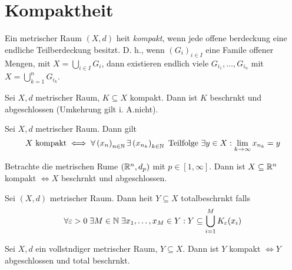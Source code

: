 \section{Kompaktheit}
\begin{definition}
	Ein metrischer Raum \((X, d)\) hei\s t \textit{kompakt}, wenn jede offene \Us berdeckung eine endliche Teil\us berdeckung besitzt. D. h., wenn $(G_i)_{i\in I}$ eine Famile offener Mengen, mit \(X = \bigcup_{i\in I} G_i\), dann existieren endlich viele \(G_{i_1},\ldots, G_{i_n}\) mit \(X = \bigcup_{k=1}^n G_{i_k}\).
\end{definition}
\begin{theorem}
	Sei \(X ,d\) metrischer Raum, \(K\subseteq X\) kompakt. Dann ist $K$ beschr\as nkt und abgeschlossen (Umkehrung gilt i. A.nicht).\label{kompakt_beschr_abg}
\end{theorem}
\begin{theorem}
	Sei \(X,d\) metrischer Raum. Dann gilt
	\[X \text{ kompakt}\iff \forall \left (x_n\right )_{n\in \mathbb{N}} \exists \left(x_{n_k}\right)_{k\in\mathbb{N}} \text{ Teilfolge } \exists y \in X: \lim_{k \to\infty} x_{n_k} = y\]
\end{theorem}
\begin{theorem}
	Betrachte die metrischen R\as ume \((\mathbb{R}^n, d_p)\) mit $p\in[1,\infty]$. Dann ist \(X\subseteq \mathbb{R}^n\) kompakt \(\iff X\) beschr\as nkt und abgeschlossen.
\end{theorem}
\begin{definition}
	Sei \((X,d)\) metrischer Raum. Dann hei\s t \(Y\subseteq X\) totalbeschr\as nkt falls
	\[\forall \varepsilon > 0 \;\exists M \in \mathbb{N}\;\exists x_1,\ldots, x_M \in Y: Y \subseteq \bigcup_{i=1}^M K_\varepsilon (x_i)\]
\end{definition}
\begin{theorem}
	Sei \(X, d\) ein vollst\as ndiger metrischer Raum, \(Y\subseteq X\). Dann ist $Y$ kompakt $\iff Y$ abgeschlossen und total beschr\as nkt. 
\end{theorem}
